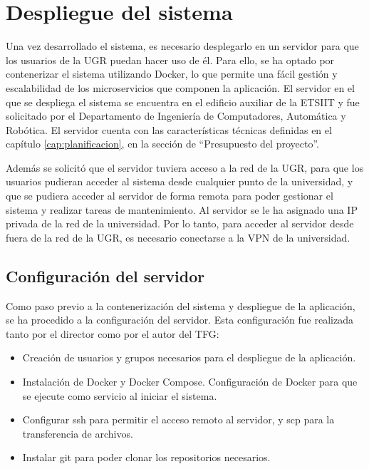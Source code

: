 \chapter{Despliegue del sistema}\label{cap:despliegue}
Una vez desarrollado el sistema, es necesario desplegarlo en un servidor para que los usuarios de la UGR puedan hacer uso de él. Para ello, se ha optado por contenerizar el sistema utilizando Docker, lo que permite una fácil gestión y escalabilidad de los microservicios que componen la aplicación.
\newline\newline
El servidor en el que se despliega el sistema se encuentra en el edificio auxiliar de la ETSIIT y fue solicitado por el Departamento de Ingeniería de Computadores, Automática y Robótica. El servidor cuenta con las características técnicas definidas en el capítulo \ref{cap:planificacion}, en la sección de ``Presupuesto del proyecto''.

Además se solicitó que el servidor tuviera acceso a la red de la UGR, para que los usuarios pudieran acceder al sistema desde cualquier punto de la universidad, y que se pudiera acceder al servidor de forma remota para poder gestionar el sistema y realizar tareas de mantenimiento.
Al servidor se le ha asignado una IP privada de la red de la universidad. Por lo tanto, para acceder al servidor desde fuera de la red de la UGR, es necesario conectarse a la VPN de la universidad.

\section{Configuración del servidor}
Como paso previo a la contenerización del sistema y despliegue de la aplicación, se ha procedido a la configuración del servidor. 
\newline\newline
Esta configuración fue realizada tanto por el director como por el autor del TFG:
\begin{itemize}
    \item Creación de usuarios y grupos necesarios para el despliegue de la aplicación.
    \item Instalación de Docker y Docker Compose. Configuración de Docker para que se ejecute como servicio al iniciar el sistema.
    \item Configurar ssh para permitir el acceso remoto al servidor, y scp para la transferencia de archivos.
    \item Instalar git para poder clonar los repositorios necesarios.
\end{itemize}

